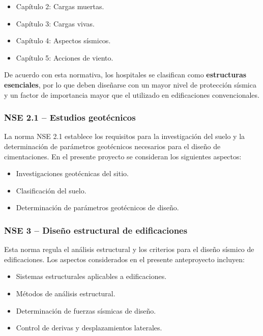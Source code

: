 \documentclass[14pt,letterpaper]{extarticle}
\begin{document}
	\begin{itemize}
		\item Capítulo 2: Cargas muertas.
		\item Capítulo 3: Cargas vivas.
		\item Capítulo 4: Aspectos sísmicos.
		\item Capítulo 5: Acciones de viento.
	\end{itemize}
	
	De acuerdo con esta normativa, los hospitales se clasifican como \textbf{estructuras esenciales}, por lo que deben diseñarse con un mayor nivel de protección sísmica y un factor de importancia mayor que el utilizado en edificaciones convencionales.
	
	\subsubsection{NSE 2.1 -- Estudios geotécnicos}
	
	La norma NSE 2.1 establece los requisitos para la investigación del suelo y la determinación de parámetros geotécnicos necesarios para el diseño de cimentaciones. En el presente proyecto se consideran los siguientes aspectos:
	
	\begin{itemize}
		\item Investigaciones geotécnicas del sitio.
		\item Clasificación del suelo.
		\item Determinación de parámetros geotécnicos de diseño.
	\end{itemize}
	
	\subsubsection{NSE 3 -- Diseño estructural de edificaciones}
	
	Esta norma regula el análisis estructural y los criterios para el diseño sísmico de edificaciones. Los aspectos considerados en el presente anteproyecto incluyen:
	
	\begin{itemize}
		\item Sistemas estructurales aplicables a edificaciones.
		\item Métodos de análisis estructural.
		\item Determinación de fuerzas sísmicas de diseño.
		\item Control de derivas y desplazamientos laterales.
	\end{itemize}
	
\end{document}
